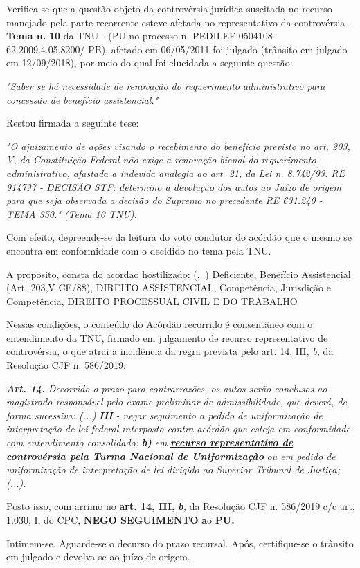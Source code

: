 \documentclass[12pt]{article}
\begin{document}
\justifying
\noindent Verifica-se que a questão objeto da controvérsia jurídica suscitada no recurso manejado pela parte recorrente esteve afetada no representativo da controvérsia - \textbf{Tema n. }\textbf{10} da TNU - (PU no processo n. PEDILEF 0504108- 62.2009.4.05.8200/ PB),  afetado em 06/05/2011 foi julgado (trânsito em julgado em 12/09/2018), por meio do qual foi elucidada a seguinte questão:

\noindent \textit{"Saber se há necessidade de renovação do requerimento administrativo para concessão de benefício assistencial."}

\noindent Restou firmada a seguinte tese:

\noindent \textit{"O ajuizamento de ações visando o recebimento do benefício previsto no art. 203, V, da Constituição Federal não exige a renovação bienal do requerimento administrativo, afastada a indevida analogia ao art. 21, da Lei n. 8.742/93. RE 914797 - DECISÃO STF: determino a devolução dos autos ao Juízo de origem para que seja observada a decisão do Supremo no precedente RE 631.240 - TEMA 350." (Tema 10 TNU).}

\noindent Com efeito, depreende-se da leitura do voto condutor do acórdão que o mesmo se encontra em conformidade com o decidido no  tema pela TNU.

\noindent A proposito, consta do acordao hostilizado: (...) Deficiente, Benefício Assistencial (Art. 203,V CF/88), DIREITO ASSISTENCIAL, Competência, Jurisdição e Competência, DIREITO PROCESSUAL CIVIL E DO TRABALHO

\noindent Nessas condições, o conteúdo do Acórdão recorrido é consentâneo com o entendimento da TNU, firmado em julgamento de recurso representativo de controvérsia, o que atrai a incidência da regra prevista pelo art. 14, III, \textit{b,} da Resolução CJF n. 586/2019:

\noindent \textit{\textbf{Art. 14.}}\textit{ Decorrido o prazo para contrarrazões, os autos serão conclusos ao magistrado responsável pelo exame preliminar de admissibilidade, que deverá, de forma sucessiva: (...) }\textit{\textbf{III }}\textit{- negar seguimento a pedido de uniformização de interpretação de lei federal interposto contra acórdão que esteja em conformidade com entendimento consolidado: }\textit{\textbf{b)}}\textit{ em }\uline{\textit{\textbf{recurso representativo de controvérsia pela Turma Nacional de Uniformização}}}\textit{ ou em pedido de uniformização de interpretação de lei dirigido ao Superior Tribunal de Justiça;(...).}

\noindent Posto isso, com arrimo no \uline{\textbf{art. 14, III, }}\uline{\textit{\textbf{b}}}\textit{,} da Resolução CJF n. 586/2019 c/c art. 1.030, I, do CPC, \textbf{NEGO SEGUIMENTO }\textbf{a}o\textbf{ PU}\textbf{.}

\noindent Intimem-se. Aguarde-se o decurso do prazo recursal. Após, certifique-se o trânsito em julgado e devolva-se ao juízo de origem.
\end{document}
